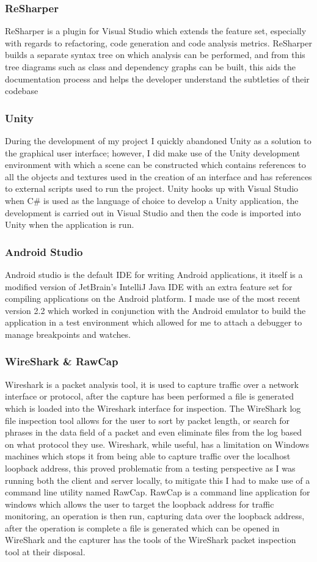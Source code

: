 \documentclass{article}
\begin{document}
\subsubsection{ReSharper}
ReSharper is a plugin for Visual Studio which extends the feature set, especially with regards to refactoring, code generation and code analysis metrics. ReSharper builds a separate syntax tree on which analysis can be performed, and from this tree diagrams such as class and dependency graphs can be built, this aids the documentation process and helps the developer understand the subtleties of their codebase
\subsubsection{Unity}
During the development of my project I quickly abandoned Unity as a solution to the graphical user interface; however, I did make use of the Unity development environment with which a scene can be constructed which contains references to all the objects and textures used in the creation of an interface and has references to external scripts used to run the project. Unity hooks up with Visual Studio when C\# is used as the language of choice to develop a Unity application, the development is carried out in Visual Studio and then the code is imported into Unity when the application is run.
\subsubsection{Android Studio}
Android studio is the default IDE for writing Android applications, it itself is a modified version of JetBrain’s IntelliJ Java IDE with an extra feature set for compiling applications on the Android platform. I made use of the most recent version 2.2 which worked in conjunction with the Android emulator to build the application in a test environment which allowed for me to attach a debugger to manage breakpoints and watches.
\subsubsection{WireShark \& RawCap}
Wireshark is a packet analysis tool, it is used to capture traffic over a network interface or protocol, after the capture has been performed a file is generated which is loaded into the Wireshark interface for inspection. The WireShark log file inspection tool allows for the user to sort by packet length, or search for phrases in the data field of a packet and even eliminate files from the log based on what protocol they use. Wireshark, while useful, has a limitation on Windows machines which stops it from being able to capture traffic over the localhost loopback address, this proved problematic from a testing perspective as I was running both the client and server locally, to mitigate this I had to make use of a command line utility named RawCap. RawCap is a command line application for windows which allows the user to target the loopback address for traffic monitoring, an operation is then run, capturing data over the loopback address, after the operation is complete a file is generated which can be opened in WireShark and the capturer has the tools of the WireShark packet inspection tool at their disposal.
\end{document}
